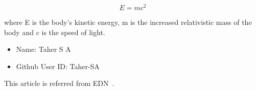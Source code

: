 \documentclass[12pt,a4paper]{article}
\begin{document}
\begin{equation}
    E = mc^2
    \label{main_eqn}
\end{equation}

where E is the body's kinetic energy, m is the increased relativistic mass of the body and c is the speed of light.

\begin{itemize}
    \item Name: Taher S A
    \item Github User ID: Taher-SA
\end{itemize}

This article is referred from EDN~\cite{edn}.  



\end{document}
